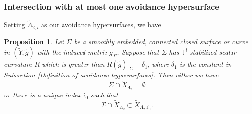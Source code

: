 \documentclass[11pt,letterpaper]{amsart}
\numberwithin{equation}{section}
\newtheorem{proposition}[theorem]{Proposition}
\theoremstyle{definition}
\begin{document}
\subsubsection{{Intersection with} at most one avoidance hypersurface}
Setting $\tilde{\Lambda}_{2,i}$ as our avoidance hypersurfaces, we have
\begin{proposition}\label{Prop: closed}
Let $\Sigma$ be a smoothly embedded, connected closed surface or curve in $(\tilde Y,\tilde g)$ with the induced metric $g_\Sigma$. Suppose that $\Sigma$ has $\mathbb T^l$-stabilized scalar curvature $R$ which is greater than $R(\tilde g)|_{\Sigma}-\delta_1$, where $\delta_1$ is the constant in Subsection \ref{Definition of avoidance hypersurfaces}.
Then either we have
$$\Sigma\cap\tilde X_{\Lambda_{2}}=\emptyset$$
or there is a unique index $i_0$ such that
$$\Sigma\cap \tilde X_{\Lambda_{2}}\subset \tilde X_{\Lambda_2,i_0}.$$
\end{proposition}
\end{document}
